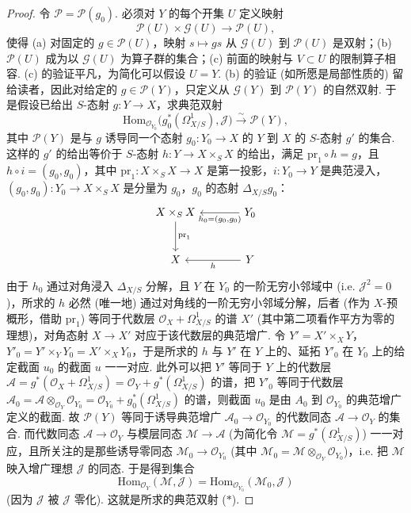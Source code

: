 \begin{proof}
令 $\mathcal{P} = \mathcal{P}(g_0)$. 必须对 $Y$ 的每个开集 $U$ 定义映射
\[
\mathcal{P}(U) \times \mathcal{G}(U) \longrightarrow \mathcal{P}(U),
\]
使得 (a) 对固定的 $g \in \mathcal{P}(U)$，映射 $s \mapsto gs$ 从 $\mathcal{G}(U)$ 到 $\mathcal{P}(U)$ 是双射；(b) $\mathcal{P}(U)$ 成为以 $\mathcal{G}(U)$ 为算子群的集合；(c) 前面的映射与 $V \subset U$ 的限制算子相容. (c) 的验证平凡，为简化可以假设 $U = Y$. (b) 的验证 (如所愿是局部性质的) 留给读者，因此对给定的 $g \in \mathcal{P}(Y)$，只定义从 $\mathcal{G}(Y)$ 到 $\mathcal{P}(Y)$ 的自然双射. 于是假设已给出 $S$-态射 $g \colon Y \to X$，求典范双射
\begin{equation}
\mathrm{Hom}_{\mathcal{O}_{Y_0}}\bigl(g_0^{*}(\varOmega_{X/S}^{1}), \mathcal{J}\bigr) \stackrel{\sim}{\longrightarrow} \mathcal{P}(Y), \tag{($*$)}
\end{equation}
其中 $\mathcal{P}(Y)$ 是与 $g$ 诱导同一个态射 $g_0 \colon Y_0 \to X$ 的 $Y$ 到 $X$ 的 $S$-态射 $g'$ 的集合. 这样的 $g'$ 的给出等价于 $S$-态射 $h \colon Y \to X \times_S X$ 的给出，满足 $\mathrm{pr}_1 \circ h = g$，且 $h \circ i = (g_0, g_0)$，其中 $\mathrm{pr}_1 \colon X \times_S X \to X$ 是第一投影，$i \colon Y_0 \to Y$ 是典范浸入，$(g_0, g_0) \colon Y_0 \to X \times_S X$ 是分量为 $g_0$，$g_0$ 的态射 $\Delta_{X/S} g_0$：
\[
\begin{tikzcd}[row sep=large, column sep=large]
X \times_S X \arrow[d,"\mathrm{pr}_1"] & Y_0 \arrow[l,"{h_0 = (g_0, g_0)}"] \\
X & Y \arrow[l,"h"]
\end{tikzcd}
\]
由于 $h_0$ 通过对角浸入 $\Delta_{X/S}$ 分解，且 $Y$ 在 $Y_0$ 的一阶无穷小邻域中 (i.e. $\mathcal{J}^2 = 0$)，所求的 $h$ 必然 (唯一地) 通过对角线的一阶无穷小邻域分解，后者 (作为 $X$-预概形，借助 $\mathrm{pr}_1$) 等同于代数层 $\mathcal{O}_X + \varOmega_{X/S}^{1}$ 的谱 $X'$ (其中第二项看作平方为零的理想)，对角态射 $X \to X'$ 对应于该代数层的典范增广. 令 $Y' = X' \times_X Y$，$Y'_0 = Y' \times_Y Y_0 = X' \times_X Y_0$，于是所求的 $h$ 与 $Y'$ 在 $Y$ 上的、延拓 $Y'_0$ 在 $Y_0$ 上的给定截面 $u_0$ 的截面 $u$ 一一对应. 此外可以把 $Y'$ 等同于 $Y$ 上的代数层 $\mathcal{A} = g^{*}(\mathcal{O}_X + \varOmega_{X/S}^{1}) = \mathcal{O}_Y + g^{*}(\varOmega_{X/S}^{1})$ 的谱，把 $Y'_0$ 等同于代数层 $\mathcal{A}_0 = \mathcal{A} \otimes_{\mathcal{O}_Y} \mathcal{O}_{Y_0} = \mathcal{O}_{Y_0} + g_0^{*}(\varOmega_{X/S}^{1})$ 的谱，则截面 $u_0$ 是由 $A_0$ 到 $\mathcal{O}_{Y_0}$ 的典范增广定义的截面. 故 $\mathcal{P}(Y)$ 等同于诱导典范增广 $\mathcal{A}_0 \to \mathcal{O}_{Y_0}$ 的代数同态 $\mathcal{A} \to \mathcal{O}_Y$ 的集合. 而代数同态 $\mathcal{A} \to \mathcal{O}_Y$ 与模层同态 $\mathcal{M} \to \mathcal{A}$ (为简化令 $\mathcal{M} = g^{*}(\varOmega_{X/S}^{1})$) 一一对应，且所关注的是那些诱导零同态 $\mathcal{M}_0 \to \mathcal{O}_{Y_0}$ (其中 $\mathcal{M}_0 = \mathcal{M} \otimes_{\mathcal{O}_Y} \mathcal{O}_{Y_0}$)，i.e. 把 $\mathcal{M}$ 映入增广理想 $\mathcal{J}$ 的同态. 于是得到集合
\[
\mathrm{Hom}_{\mathcal{O}_Y}(\mathcal{M}, \mathcal{J}) = \mathrm{Hom}_{\mathcal{O}_{Y_0}}(\mathcal{M}_0, \mathcal{J})
\]
(因为 $\mathcal{J}$ 被 $\mathcal{J}$ 零化). 这就是所求的典范双射 ($*$).
\end{proof}

